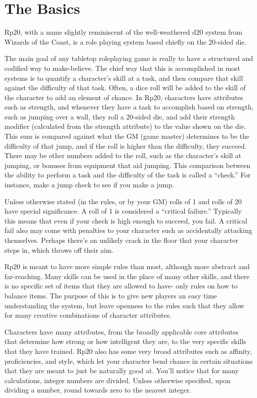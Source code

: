 \chapter{The Basics}
Rp20, with a name slightly reminiscent of the well-weathered d20 system from Wizards of the Coast, is a role playing system based chiefly on the 20-sided die.

The main goal of any tabletop roleplaying game is really to have  a structured and codified way to make-believe. The chief way that this is accomplished in most systems is to quantify a character’s skill at a task, and then compare that skill against the difficulty of that task. Often, a dice roll will be added to the skill of the character to add an element of chance. In Rp20, characters have attributes such as strength, and whenever they have a task to accomplish based on strength, such as jumping over a wall, they roll a 20-sided die, and add their strength modifier (calculated from the strength attribute) to the value shown on the die. This sum is compared against what the GM (game master) determines to be the difficulty of that jump, and if the roll is higher than the difficulty, they succeed. There may be other numbers added to the roll, such as the character’s skill at jumping, or bonuses from equipment that aid jumping. This comparison between the ability to perform a task and the difficulty of the task is called a “check.” For instance, make a jump check to see if you make a jump.

Unless otherwise stated (in the rules, or by your GM) rolls of 1 and rolls of 20 have special significance. A roll of 1 is considered a ``critical failure.'' Typically this means that even if your check is high enough to succeed, you fail. A critical fail also may come with penalties to your character such as accidentally attacking themselves. Perhaps there’s an unlikely crack in the floor that your character steps in, which throws off their aim.

Rp20 is meant to have more simple rules than most, although more abstract and far-reaching. Many skills can be used in the place of many other skills, and there is no specific set of items that they are allowed to have- only rules on how to balance items. The purpose of this is to give new players an easy time understanding the system, but leave openness to the rules such that they allow for many creative combinations of character attributes.

Characters have many attributes, from the broadly applicable core attributes that determine how strong or how intelligent they are, to the very specific skills that they have trained. Rp20 also has some very broad attributes such as affinity, proficiencies, and style, which let your character bend chance in certain situations that they are meant to just be naturally good at.
You’ll notice that for many calculations, integer numbers are divided. Unless otherwise specified, upon dividing a number, round towards zero to the nearest integer.

